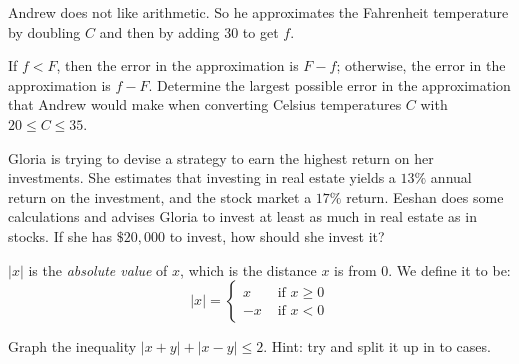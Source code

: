 \documentclass[english,12pt]{article}
\theoremstyle{plain}
\theoremstyle{definition}
\theoremstyle{definition} %
\begin{document}
{Andrew does not like arithmetic.  So he approximates the Fahrenheit temperature by doubling $C$ and then by adding $30$ to get $f$.

If $f<F$, then the error in the approximation is $F-f$; otherwise, the error in the approximation is $f-F$.  Determine the largest possible error in the approximation that Andrew would make when converting Celsius temperatures $C$ with $20\le C\le 35$.

\item Gloria is trying to devise a strategy to earn the highest return on her investments.  She estimates that investing in real estate yields a $13\%$ annual return on the investment, and the stock market a $17\%$ return.  Eeshan does some calculations and advises Gloria to invest at least as much in real estate as in stocks.  If she has $\$20,000$ to invest, how should she invest it?

\item $|x|$ is the \emph{absolute value} of $x$, which is the distance $x$ is from $0$.  We define it to be:
\[|x|=\begin{cases}x & \text{ if }x\ge 0\\
-x & \text{ if }x<0\end{cases}\]

Graph the inequality $|x+y|+|x-y|\le 2$.  Hint: try and split it up in to cases.
}
\end{document}
